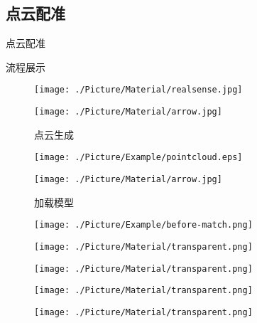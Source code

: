 \documentclass[xcolor=table,notheorems,compress,blue]{beamer}
\begin{document}
  \subsection{点云配准}
	\begin{frame}{点云配准}
		\begin{exampleblock}{流程展示}
			\begin{figure}[htpb]
				\centering
				\begin{minipage}[b]{0.8in}
					\centerline{ \texttt{[image: ./Picture/Material/realsense.jpg]} }
				\end{minipage}
				\begin{minipage}[b]{0.8in}
					\centerline{ \quad}
					\centerline{ \texttt{[image: ./Picture/Material/arrow.jpg]} }
					\centerline{\tiny{点云生成}}
				\end{minipage}
				\begin{minipage}[b]{0.8in}
					\centerline{ \texttt{[image: ./Picture/Example/pointcloud.eps]} }
				\end{minipage}
				\begin{minipage}[b]{0.8in}
					\centerline{ \texttt{[image: ./Picture/Material/arrow.jpg]} }
					\centerline{\tiny{加载模型}}
				\end{minipage}
				\begin{minipage}[b]{0.8in}
					\centerline{ \texttt{[image: ./Picture/Example/before-match.png]} }
				\end{minipage}
			\end{figure}
			\vspace{-25pt}
			\begin{figure}[htpb]
				\centering
				\begin{minipage}[b]{0.8in}
					\centerline{ \texttt{[image: ./Picture/Material/transparent.png]} }
				\end{minipage}
				\begin{minipage}[b]{0.8in}
					\centerline{ \texttt{[image: ./Picture/Material/transparent.png]} }
				\end{minipage}
				\begin{minipage}[b]{0.8in}
					\centerline{ \texttt{[image: ./Picture/Material/transparent.png]} }
				\end{minipage}
				\begin{minipage}[b]{0.8in}
					\centerline{ \texttt{[image: ./Picture/Material/transparent.png]} }

\end{minipage}
\end{figure}
\end{exampleblock}
\end{frame}
\end{document}
